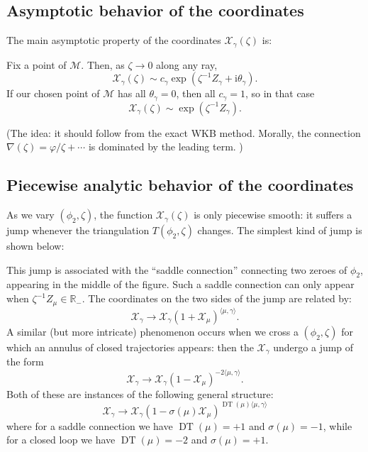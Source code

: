 \documentclass[12pt,letterpaper,reqno]{article}
\numberwithin{equation}{section}
\newcommand{\cM}{\ensuremath{\mathcal M}}
\newcommand{\cX}{\ensuremath{\mathcal X}}
\newcommand{\bbR}{\ensuremath{\mathbb R}}
\newcommand{\I}{{\mathrm i}}
\newcommand{\IP}[1]{\langle#1\rangle}
\DeclareMathOperator{\DT}{DT}
\newcommand{\insfig}[2]{

\medskip
\noindent
\begin{minipage}{\linewidth}

\makebox[\linewidth]{\texttt{[image: figures/\#1-crop.pdf]}}

\end{minipage}
\medskip

}
\newcommand{\fixme}[1]{{\color{orange}{[#1]}}}
\begin{document}
\subsection{Asymptotic behavior of the coordinates}

The main asymptotic property of the coordinates $\cX_\gamma(\zeta)$ is:
\begin{conj}
Fix a point of $\cM$.
Then, as $\zeta \to 0$ along any ray,
\begin{equation}
  \cX_\gamma(\zeta) \sim c_\gamma \exp \left(\zeta^{-1} Z_\gamma + \I \theta_\gamma \right).
\end{equation}
If our chosen point of $\cM$ has all 
$\theta_\gamma = 0$, then all $c_\gamma = 1$, so in that case
\begin{equation}
  \cX_\gamma(\zeta) \sim \exp \left(\zeta^{-1} Z_\gamma\right).
\end{equation}
\end{conj}
(The idea: it should follow from the exact WKB method. Morally,
the connection $\nabla(\zeta) = \varphi / \zeta + \cdots$ 
is dominated by the leading term. \fixme{explain a little more?})

\subsection{Piecewise analytic behavior of the coordinates}

As we vary $(\phi_2, \zeta)$, the
function $\cX_\gamma(\zeta)$ is only piecewise 
smooth: it suffers
a jump whenever the triangulation $T(\phi_2, \zeta)$
changes. 
The simplest kind of jump is shown below:
\insfig{higgs-metric-11}{1.25}
This jump is associated with the ``saddle connection'' 
connecting two zeroes of $\phi_2$, 
appearing in the middle of the figure.
Such a saddle connection can only 
appear when $\zeta^{-1} Z_\mu \in \bbR_-$.
The coordinates on the two sides of the jump are related by:
\begin{equation}
  \cX_\gamma \to \cX_\gamma(1 + \cX_\mu)^{\IP{\mu,\gamma}}.
\end{equation}
A similar (but more intricate) 
phenomenon occurs when we cross a $(\phi_2, \zeta)$
for which an annulus of closed trajectories appears: 
then the $\cX_\gamma$ undergo a jump of the form
\begin{equation}
  \cX_\gamma \to \cX_\gamma(1 - \cX_\mu)^{-2 \IP{\mu,\gamma}}.
\end{equation}
Both of these are instances of the following general
structure:
\begin{equation} \label{eq:ks-map}
  \cX_\gamma \to \cX_\gamma(1 - \sigma(\mu) \cX_\mu)^{\DT(\mu) \IP{\mu,\gamma}}
\end{equation}
where for a saddle connection
we have $\DT(\mu) = +1$ and $\sigma(\mu) = -1$, while
for a closed loop we have $\DT(\mu) = -2$ and $\sigma(\mu) = +1$.
\end{document}
